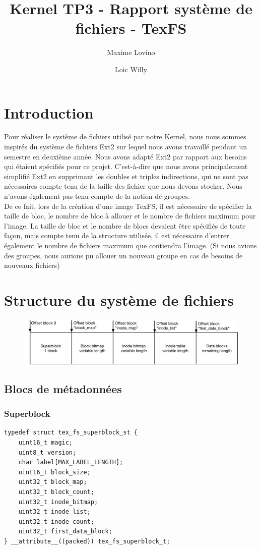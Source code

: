 \documentclass{article}
\title{Kernel TP3 - Rapport système de fichiers - TexFS}
\author{Maxime Lovino \and Loic Willy}
\begin{document}
\maketitle
\newpage
\section{Introduction}
Pour réaliser le système de fichiers utilisé par notre Kernel, nous nous sommes inspirés du système de fichiers Ext2 sur lequel nous avons travaillé pendant un semestre en deuxième année. Nous avons adapté Ext2 par rapport aux besoins qui étaient spécifiés pour ce projet. C'est-à-dire que nous avons principalement simplifié Ext2 en supprimant les doubles et triples indirections, qui ne sont pas nécessaires compte tenu de la taille des fichier que nous devons stocker. Nous n'avons également pas tenu compte de la notion de groupes.\\

De ce fait, lors de la création d'une image TexFS, il est nécessaire de spécifier la taille de bloc, le nombre de bloc à allouer et le nombre de fichiers maximum pour l'image. La taille de bloc et le nombre de blocs devaient être spécifiés de toute façon, mais compte tenu de la structure utilisée, il est nécessaire d'entrer également le nombre de fichiers maximum que contiendra l'image. (Si nous avions des groupes, nous aurions pu allouer un nouveau groupe en cas de besoins de nouveaux fichiers)
\section{Structure du système de fichiers}
\begin{figure}[H]
    \centering
    \includegraphics[width=\textwidth]{FS_disk_structure.png}
\end{figure}
\subsection{Blocs de métadonnées}
\subsubsection{Superblock}
\begin{verbatim}
typedef struct tex_fs_superblock_st {
    uint16_t magic;
    uint8_t version;
    char label[MAX_LABEL_LENGTH];
    uint16_t block_size;
    uint32_t block_map;
    uint32_t block_count;
    uint32_t inode_bitmap;
    uint32_t inode_list;
    uint32_t inode_count;
    uint32_t first_data_block;
} __attribute__((packed)) tex_fs_superblock_t;	
\end{verbatim}
\end{document}
